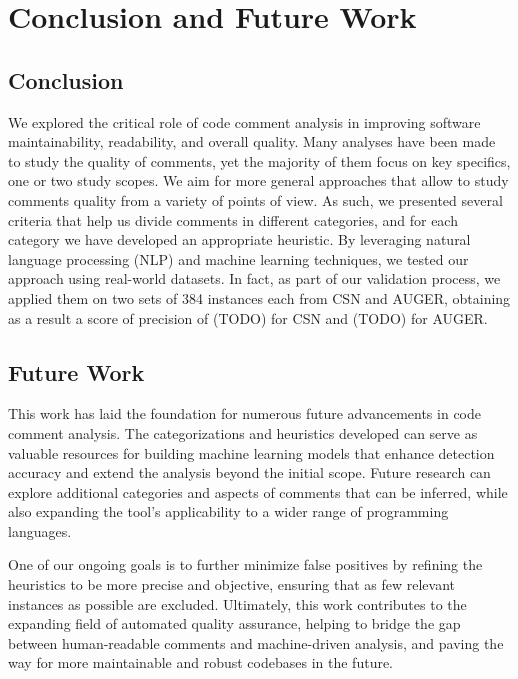 
\chapter{Conclusion and Future Work} %

\label{Chapter5}


\section{Conclusion}
We explored the critical role of code comment analysis in improving software maintainability, readability, and overall quality. Many analyses have been made to study the quality of comments, yet the majority of them focus on key specifics, one or two study scopes. We aim for more general approaches that allow to study comments quality from a variety of points of view. As such, we presented several criteria that help us divide comments in different categories, and for each category we have developed an appropriate heuristic. By leveraging natural language processing (NLP) and machine learning techniques, we tested our approach using real-world datasets. In fact, as part of our validation process, we applied them on two sets of 384 instances each from CSN and AUGER, obtaining as a result a score of precision of (TODO) for CSN and (TODO) for AUGER.

\section{Future Work}
This work has laid the foundation for numerous future advancements in code comment analysis. The categorizations and heuristics developed can serve as valuable resources for building machine learning models that enhance detection accuracy and extend the analysis beyond the initial scope. Future research can explore additional categories and aspects of comments that can be inferred, while also expanding the tool's applicability to a wider range of programming languages.

\noindent One of our ongoing goals is to further minimize false positives by refining the heuristics to be more precise and objective, ensuring that as few relevant instances as possible are excluded. Ultimately, this work contributes to the expanding field of automated quality assurance, helping to bridge the gap between human-readable comments and machine-driven analysis, and paving the way for more maintainable and robust codebases in the future.